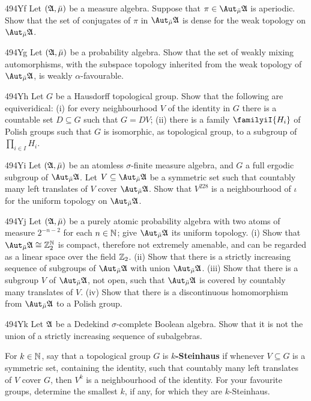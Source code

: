 {\spheader 494Yf Let $(\frak A,\bar\mu)$ be a measure algebra.   Suppose
that $\pi\in\AmuA$ is aperiodic.   Show that the set of conjugates of $\pi$
in $\AmuA$ is dense for the weak topology on $\AmuA$.

\spheader 494Yg Let $(\frak A,\bar\mu)$ be a probability algebra.   Show
that the set of weakly mixing automorphisms, with the subspace topology
inherited from the weak topology of $\AmuA$, is weakly $\alpha$-favourable.

\spheader 494Yh Let $G$ be a Hausdorff
topological group.   Show that the following
are equiveridical:  (i) for every neighbourhood $V$ of the identity in $G$
there is a countable set $D\subseteq G$ such that $G=DV$;  (ii)
there is a family $\familyiI{H_i}$ of Polish groups such that
$G$ is isomorphic, as topological group, to a subgroup of
$\prod_{i\in I}H_i$.

\spheader 494Yi Let $(\frak A,\bar\mu)$ be an atomless
$\sigma$-finite measure algebra, and $G$ a full ergodic subgroup of
$\AmuA$.   Let $V\subseteq\AmuA$ be a symmetric set such that
countably many left translates of $V$ cover $\AmuA$.   Show that $V^{228}$
is a neighbourhood of $\iota$ for the uniform topology on $\AmuA$.

\spheader 494Yj Let $(\frak A,\bar\mu)$ be a purely atomic probability
algebra with two atoms of measure $2^{-n-2}$ for each $n\in\Bbb N$;  give
$\AmuA$ its uniform topology.   (i) Show that $\AmuA\cong\Bbb Z_2^{\Bbb N}$
is compact, therefore not extremely amenable, and can be regarded as a
linear space over the field $\Bbb Z_2$.
(ii) Show that there is a strictly increasing sequence of
subgroups of $\AmuA$ with union $\AmuA$.
(iii) Show that there is a subgroup $V$ of $\AmuA$, not open,
such that $\AmuA$ is covered
by countably many translates of $V$.   (iv) Show that there is a
discontinuous homomorphism from $\AmuA$ to a Polish group.

\spheader 494Yk Let $\frak A$ be a Dedekind $\sigma$-complete Boolean
algebra.   Show that it is not the union of a strictly increasing sequence
of subalgebras.


}%

 For $k\in\Bbb N$, say that a topological
group $G$ is {\bf $k$-Steinhaus} if whenever $V\subseteq G$ is a symmetric
set, containing the identity, such that countably many left translates of
$V$ cover $G$, then $V^k$
is a neighbourhood of the identity.   For your favourite groups, determine
the smallest $k$, if any, for which they are $k$-Steinhaus.

